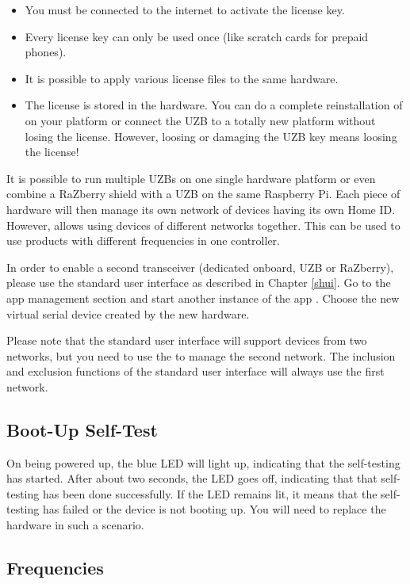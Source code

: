 \begin{itemize}
\item You must be connected to the internet to activate the license key.
\item Every license key can only be used once (like scratch cards for prepaid phones).
\item It is possible to apply various license files to the same hardware.
\item The license is stored in the hardware. You can do a complete reinstallation of \zway on 
your platform or connect the UZB to a totally new platform without losing the license. 
However, loosing or damaging the UZB key means loosing the license!
\end{itemize}
It is possible to run multiple UZBs on one single hardware platform or even combine a 
RaZberry shield with a UZB on the same Raspberry Pi. Each piece of hardware will then 
manage its own network of \zwave devices having its own Home ID. However, \zway allows 
using devices of different \zwave networks together. This can be used to use products 
with different frequencies in one controller.

In order to enable a second \zwave transceiver (dedicated onboard, UZB or RaZberry), 
please use the standard user interface as described in Chapter \ref{shui}. 
Go to the app management section and start another instance of the app . 
Choose the new virtual serial device created by the new hardware.

Please note that the standard user interface will support devices from two networks, but 
you need to use the \zweui to manage the second network. The inclusion and exclusion 
functions of the standard user interface will always use the first \zwave network.

\subsection{Boot-Up Self-Test}

On being powered up, the blue LED will light up, indicating that the self-testing has started. 
After about two seconds, the LED goes off, indicating that that self-testing has been 
done successfully. If the LED remains lit, it means that the self-testing has failed or 
the device is not booting up. You will need to replace the hardware in such a scenario.


\subsection{Frequencies}


